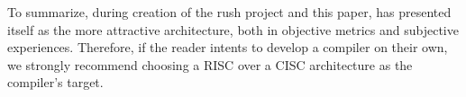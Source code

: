 To summarize, during creation of the rush project and this paper,
\riscv{} has presented itself as the more attractive architecture,
both in objective metrics and subjective experiences.
Therefore, if the reader intents to develop a compiler on their own,
we strongly recommend choosing a RISC over a CISC architecture as the compiler's target.
